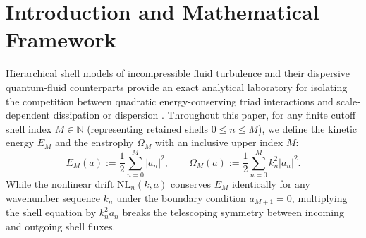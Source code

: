 \documentclass[11pt,a4paper]{article}
\theoremstyle{definition}
\theoremstyle{remark}
\begin{document}
\section{Introduction and Mathematical Framework}

Hierarchical shell models of incompressible fluid turbulence and their dispersive quantum-fluid counterparts provide an exact analytical laboratory for isolating the competition between quadratic energy-conserving triad interactions and scale-dependent dissipation or dispersion \cite{KatzPavlovic2005,Cheskidov2008,BarbatoMorandinRomito2011}. Throughout this paper, for any finite cutoff shell index $M \in \mathbb{N}$ (representing retained shells $0 \le n \le M$), we define the kinetic energy $E_M$ and the enstrophy $\Omega_M$ with an inclusive upper index $M$:
\begin{equation}\label{eq:omega_def}
E_M(a) := \frac{1}{2} \sum_{n=0}^{M} |a_n|^2, \qquad \Omega_M(a) := \frac{1}{2} \sum_{n=0}^{M} k_n^2 |a_n|^2.
\end{equation}
While the nonlinear drift $\mathrm{NL}_n(k,a)$ conserves $E_M$ identically for any wavenumber sequence $k_n$ under the boundary condition $a_{M+1} = 0$, multiplying the shell equation by $k_n^2 a_n$ breaks the telescoping symmetry between incoming and outgoing shell fluxes.
\end{document}
